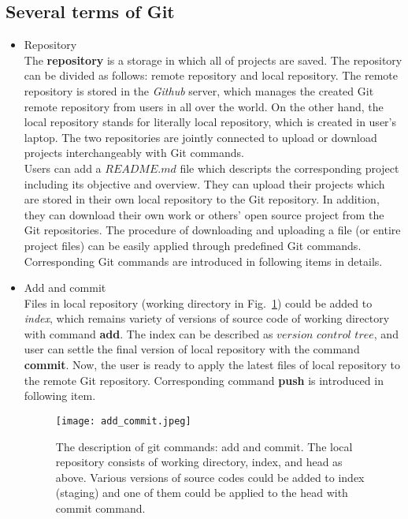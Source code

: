 \documentclass{article}
\begin{document}
\subsection{Several terms of Git}
\begin{itemize}
    \item Repository \\
    \hspace*{1mm} The \textbf{repository} is a storage in which all of projects are saved. The repository can be divided as follows: remote repository and local repository. The remote repository is stored in the \textit{Github} server, which manages the created Git remote repository from users in all over the world. On the other hand, the local repository stands for literally local repository, which is created in user's laptop. The two repositories are jointly connected to upload or download projects interchangeably with Git commands. \\ 
    \hspace*{1mm} Users can add a $README.md$ file which descripts the corresponding project including its objective and overview. They can upload their projects which are stored in their own local repository to the Git repository. In addition, they can download their own work or others' open source project from the Git repositories. The procedure of downloading and uploading a file (or entire project files) can be easily applied through predefined Git commands. Corresponding Git commands are introduced in following items in details. 
    \item Add and commit \\ 
    \hspace*{1mm} Files in local repository (working directory in Fig.~\ref{fig:add_command}) could be added to \textit{index}, which remains variety of versions of source code of working directory with command \textbf{add}. The index can be described as $version$ $control$ $tree$, and user can settle the final version of local repository with the command \textbf{commit}. Now, the user is ready to apply the latest files of local repository to the remote Git repository. Corresponding command \textbf{push} is introduced in following item. 
    
    \begin{figure}[h!]
        \centering
        \texttt{[image: add\_commit.jpeg]}
        \caption{The description of git commands: add and commit. The local repository consists of working directory, index, and head as above. Various versions of source codes could be added to index (staging) and one of them could be applied to the head with commit command.}
        \label{fig:add_command}
    \end{figure}
    

\end{itemize}
\end{document}
